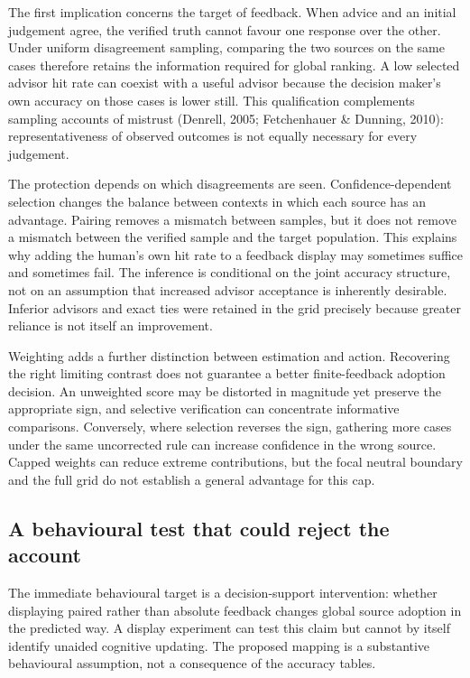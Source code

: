 \documentclass[
  british,
  11pt,
]{article}
\begin{document}
The first implication concerns the target of feedback. When advice and
an initial judgement agree, the verified truth cannot favour one
response over the other. Under uniform disagreement sampling, comparing
the two sources on the same cases therefore retains the information
required for global ranking. A low selected advisor hit rate can coexist
with a useful advisor because the decision maker's own accuracy on those
cases is lower still. This qualification complements sampling accounts
of mistrust (Denrell, 2005; Fetchenhauer \& Dunning, 2010):
representativeness of observed outcomes is not equally necessary for
every judgement.

The protection depends on which disagreements are seen.
Confidence-dependent selection changes the balance between contexts in
which each source has an advantage. Pairing removes a mismatch between
samples, but it does not remove a mismatch between the verified sample
and the target population. This explains why adding the human's own hit
rate to a feedback display may sometimes suffice and sometimes fail. The
inference is conditional on the joint accuracy structure, not on an
assumption that increased advisor acceptance is inherently desirable.
Inferior advisors and exact ties were retained in the grid precisely
because greater reliance is not itself an improvement.

Weighting adds a further distinction between estimation and action.
Recovering the right limiting contrast does not guarantee a better
finite-feedback adoption decision. An unweighted score may be distorted
in magnitude yet preserve the appropriate sign, and selective
verification can concentrate informative comparisons. Conversely, where
selection reverses the sign, gathering more cases under the same
uncorrected rule can increase confidence in the wrong source. Capped
weights can reduce extreme contributions, but the focal neutral boundary
and the full grid do not establish a general advantage for this cap.

\subsection{A behavioural test that could reject the
account}\label{a-behavioural-test-that-could-reject-the-account}

The immediate behavioural target is a decision-support intervention:
whether displaying paired rather than absolute feedback changes global
source adoption in the predicted way. A display experiment can test this
claim but cannot by itself identify unaided cognitive updating. The
proposed mapping is a substantive behavioural assumption, not a
consequence of the accuracy tables.
\end{document}
